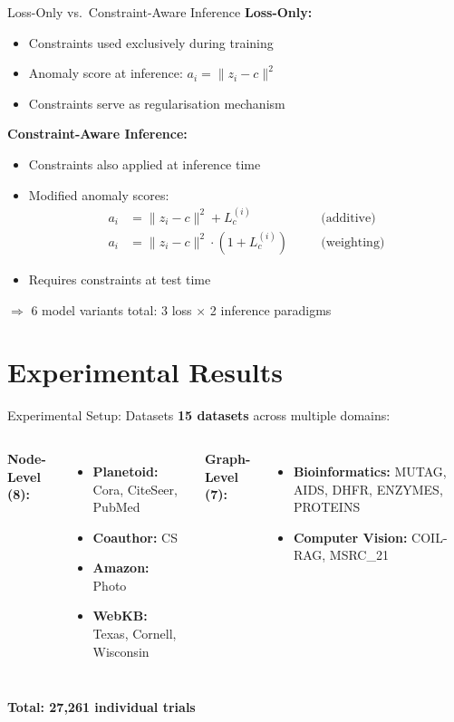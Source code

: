 \documentclass[aspectratio=169]{beamer}
\begin{document}
\begin{frame}{Loss-Only vs.\ Constraint-Aware Inference}
    \textbf{Loss-Only:}
    \begin{itemize}
        \item Constraints used exclusively during training
        \item Anomaly score at inference: $a_i = \| z_i - c \|^2$
        \item Constraints serve as regularisation mechanism
    \end{itemize}

    \textbf{Constraint-Aware Inference:}
    \begin{itemize}
        \item Constraints also applied at inference time
        \item Modified anomaly scores:
        \begin{align*}
            a_i &= \| z_i - c \|^2 + L_c^{(i)} \quad &&\text{(additive)} \\
            a_i &= \| z_i - c \|^2 \cdot (1 + L_c^{(i)}) \quad &&\text{(weighting)}
        \end{align*}
        \item Requires constraints at test time
    \end{itemize}

    $\Rightarrow$ 6 model variants total: 3 loss $\times$ 2 inference paradigms
\end{frame}

\section{Experimental Results}

\begin{frame}{Experimental Setup: Datasets}
    \textbf{15 datasets} across multiple domains:

    \begin{columns}
        \textbf{Node-Level (8):}
        \begin{itemize}
            \item \textbf{Planetoid:} Cora, CiteSeer, PubMed
            \item \textbf{Coauthor:} CS
            \item \textbf{Amazon:} Photo
            \item \textbf{WebKB:} Texas, Cornell, Wisconsin
        \end{itemize}

        \textbf{Graph-Level (7):}
        \begin{itemize}
            \item \textbf{Bioinformatics:} MUTAG, AIDS, DHFR, ENZYMES, PROTEINS
            \item \textbf{Computer Vision:} COIL-RAG, MSRC\_21
        \end{itemize}
    \end{columns}

    \vspace{0.3cm}
    \textbf{Total: 27,261 individual trials}
\end{frame}
\end{document}
